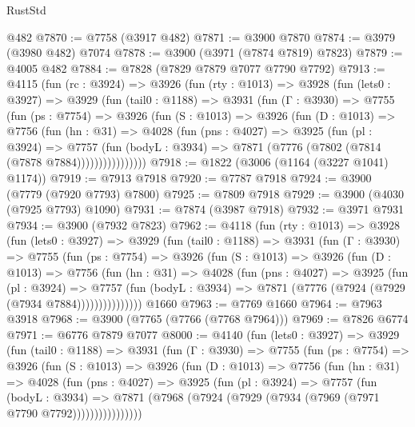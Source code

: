 \begin{lexlean}{RustStd}
\begin{coremodule}
    @482
@7870 := @7758 (@3917 @482)
@7871 := @3900 @7870
@7874 := @3979 (@3980 @482) @7074
@7878 := @3900 (@3971 (@7874 @7819) @7823)
@7879 := @4005 @482
@7884 := @7828 (@7829 @7879 @7077 @7790 @7792)
@7913 := @4115
    (fun (rc : @3924) =>
    @3926
      (fun (rty : @1013) =>
      @3928
        (fun (lets0 : @3927) =>
        @3929
          (fun (tail0 : @1188) =>
          @3931
            (fun (Γ : @3930) =>
            @7755
              (fun (ps : @7754) =>
              @3926
                (fun (S : @1013) =>
                @3926
                  (fun (D : @1013) =>
                  @7756
                    (fun (hn : @31) =>
                    @4028
                      (fun (pns : @4027) =>
                      @3925
                        (fun (pl : @3924) =>
                        @7757
                          (fun (bodyL : @3934) =>
                          @7871 (@7776 (@7802 (@7814 (@7878 @7884))))))))))))))))
@7918 := @1822 (@3006 (@1164 (@3227 @1041) @1174))
@7919 := @7913 @7918
@7920 := @7787 @7918
@7924 := @3900 (@7779 (@7920 @7793) @7800)
@7925 := @7809 @7918
@7929 := @3900 (@4030 (@7925 @7793) @1090)
@7931 := @7874 (@3987 @7918)
@7932 := @3971 @7931
@7934 := @3900 (@7932 @7823)
@7962 := @4118
    (fun (rty : @1013) =>
    @3928
      (fun (lets0 : @3927) =>
      @3929
        (fun (tail0 : @1188) =>
        @3931
          (fun (Γ : @3930) =>
          @7755
            (fun (ps : @7754) =>
            @3926
              (fun (S : @1013) =>
              @3926
                (fun (D : @1013) =>
                @7756
                  (fun (hn : @31) =>
                  @4028
                    (fun (pns : @4027) =>
                    @3925
                      (fun (pl : @3924) =>
                      @7757
                        (fun (bodyL : @3934) =>
                        @7871 (@7776 (@7924 (@7929 (@7934 @7884)))))))))))))))
    @1660
@7963 := @7769 @1660
@7964 := @7963 @3918
@7968 := @3900 (@7765 (@7766 (@7768 @7964)))
@7969 := @7826 @6774
@7971 := @6776 @7879 @7077
@8000 := @4140
    (fun (lets0 : @3927) =>
    @3929
      (fun (tail0 : @1188) =>
      @3931
        (fun (Γ : @3930) =>
        @7755
          (fun (ps : @7754) =>
          @3926
            (fun (S : @1013) =>
            @3926
              (fun (D : @1013) =>
              @7756
                (fun (hn : @31) =>
                @4028
                  (fun (pns : @4027) =>
                  @3925
                    (fun (pl : @3924) =>
                    @7757
                      (fun (bodyL : @3934) =>
                      @7871 (@7968 (@7924 (@7929 (@7934 (@7969 (@7971 @7790 @7792))))))))))))))))

\end{coremodule}
\end{lexlean}
